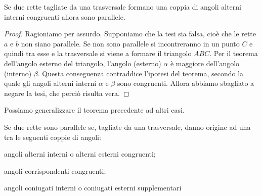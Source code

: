 \begin{inaccessibleblock}
    \begin{center}\end{center}
\end{inaccessibleblock}

\begin{teorema}
  Se due rette tagliate da una trasversale formano una coppia di angoli 
  alterni interni congruenti allora sono parallele.
\end{teorema}

\begin{minipage}{.49\textwidth}
\begin{proof}
  Ragioniamo per assurdo. Supponiamo che la tesi sia falsa, cioè che le 
  rette \(a\) e \(b\) non siano parallele. Se non sono parallele si 
  incontreranno in un punto \(C\) e quindi tra esse e la trasversale si 
  viene a formare il triangolo \(ABC\). Per il teorema dell'angolo 
  esterno del triangolo, l'angolo (esterno) \(\alpha\) è maggiore 
  dell'angolo (interno) \(\beta\). Questa conseguenza contraddice 
  l'ipotesi del teorema, secondo la quale gli angoli alterni interni 
  \(\alpha\) e \(\beta\) sono congruenti. Allora abbiamo sbagliato a negare 
  la tesi, che perciò risulta vera.
\end{proof}
\end{minipage}
\begin{minipage}{.49\textwidth}
\begin{inaccessibleblock}
    \centering
\end{inaccessibleblock}
\end{minipage}


Possiamo generalizzare il teorema precedente ad altri casi.
\begin{teorema}
  Se due rette sono parallele se, tagliate da una trasversale, danno 
origine ad una tra le seguenti coppie di angoli:
  \begin{itemize*}
    \item angoli alterni interni o alterni esterni congruenti;
    \item angoli corrispondenti congruenti;
    \item angoli coniugati interni o coniugati esterni supplementari
  \end{itemize*}
\end{teorema}

